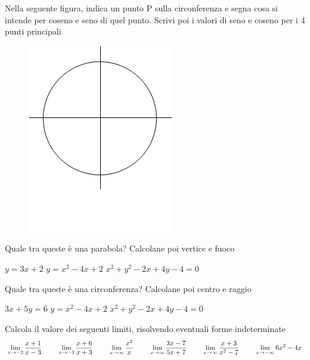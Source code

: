 \documentclass[addpoints]{exam}
\begin{document}
 
\begin{center}
\end{center}

\vspace{5mm}

 
\begin{questions}

\question[1] Nella seguente figura, indica un punto P sulla circonferenza e segna cosa si intende per coseno e seno di quel punto. Scrivi poi i valori di seno e coseno per i 4 punti principali

\begin{figure}[h!]
	\centering
	\includegraphics[scale=0.3]{SenoCoseno.png}
\end{figure}

\question[1] Quale tra queste è una parabola? Calcolane poi vertice e fuoco
\begin{checkboxes}
	\choice $y=3x+2$
	\choice $y=x^2-4x+2$
	\choice $x^2+y^2-2x+4y-4=0$
\end{checkboxes}

\question[1] Quale tra queste è una circonferenza? Calcolane poi centro e raggio
\begin{checkboxes}
	\choice $3x+5y=6$
	\choice $y=x^2-4x+2$
	\choice $x^2+y^2-2x+4y-4=0$
\end{checkboxes}

\question[2] Calcola il valore dei seguenti limiti, risolvendo eventuali forme indeterminate
	\begin{align*}
	\lim_{x \to -2} \frac{x+1}{x-3} \hspace{8mm}
	\lim_{x \to -3} \frac{x+6}{x+3} \hspace{8mm}
	\lim_{x \to \infty} \frac{x^2}{x} \hspace{8mm}
	\lim_{x \to \infty} \frac{3x-7}{5x+7} \hspace{8mm}
	\lim_{x \to \infty} \frac{x+3}{x^2-7} \hspace{8mm}
	\lim_{x \to -\infty} 6x^2-4x
	\end{align*}
	

\end{questions}
\end{document}
